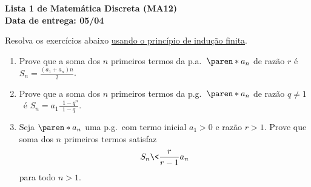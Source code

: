 \documentclass[10pt]{book}
\begin{document}
             

\begin{center}
  \textbf{Lista 1 de Matemática Discreta (MA12) \\ Data de entrega: 05/04}
\end{center}

\bigskip


Resolva os exercícios abaixo \underline{usando o princípio de indução finita}.

\begin{enumerate}


\item Prove que a soma dos $n$ primeiros termos da p.a.~$\paren*{a_n}$
  de razão $r$ é $S_n = \frac{(a_1+a_n)n}2$.


\item Prove que a soma dos $n$ primeiros termos da p.g.~$\paren*{a_n}$
  de razão $q\neq 1$~é $S_n = a_1\frac{\;\; 1-q^n}{1-q}$.

  
\item Seja $\paren*{a_n}$ uma p.g.~com termo inicial $a_1>0$ e razão
  $r>1$. Prove que soma dos $n$ primeiros termos satisfaz
  \[ S_n \< \frac r{r-1}a_n\] para todo $n>1$.

\end{enumerate}
\end{document}
